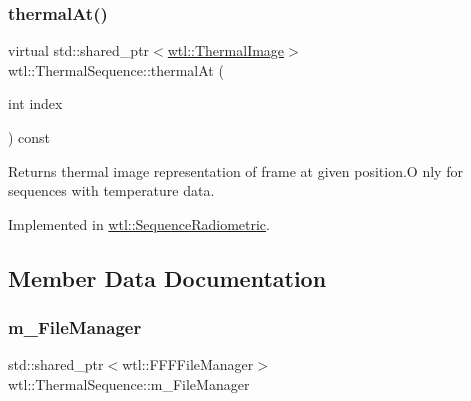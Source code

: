 \subsubsection{\texorpdfstring{thermal\+At()}{thermalAt()}}
{\footnotesize\ttfamily virtual std\+::shared\+\_\+ptr$<$\hyperlink{classwtl_1_1_thermal_image}{wtl\+::\+Thermal\+Image}$>$ wtl\+::\+Thermal\+Sequence\+::thermal\+At (\begin{DoxyParamCaption}\item[{int}]{index }\end{DoxyParamCaption}) const\hspace{0.3cm}{\ttfamily [pure virtual]}}



Returns thermal image representation of frame at given position.\+O nly for sequences with temperature data. 



Implemented in \hyperlink{classwtl_1_1_sequence_radiometric_ae7b8f68b95bdda29cd202570c4fb9fbd}{wtl\+::\+Sequence\+Radiometric}.



\subsection{Member Data Documentation}
\mbox{\label{classwtl_1_1_thermal_sequence_a8b3a995d93dad09344825622df9f418b}} 
\subsubsection{\texorpdfstring{m\+\_\+\+File\+Manager}{m\_FileManager}}
{\footnotesize\ttfamily std\+::shared\+\_\+ptr$<$wtl\+::\+F\+F\+F\+File\+Manager$>$ wtl\+::\+Thermal\+Sequence\+::m\+\_\+\+File\+Manager\hspace{0.3cm}{\ttfamily [protected]}}

\mbox{\label{classwtl_1_1_thermal_sequence_a9af26492b66fcd91aecb62aaf1508a8f}} 
